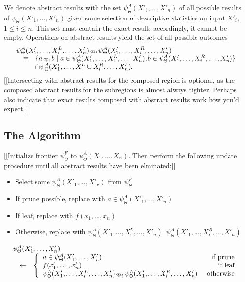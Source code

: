 \documentclass{article}
\newcommand{\opsym}{{\scriptstyle \mathrm{o\!p}}}
\newcommand{\opcurry}[3][]{\mathop{\opsym^{#1}_{#2}{#3}}}
\newcommand{\op}[2][]{\opcurry[#1]{#2}{}}
\newcommand{\GNP}{\psi_{\Theta}}
\begin{document}
We denote abstract results with the set $\GNP^A(X'_1,\ldots,X'_n)$ of
all possible results of $\GNP(X'_1,\ldots,X'_n)$ given some selection
of descriptive statistics on input $X'_i$, $1 \leq i \leq n$.  This
set must contain the exact result; accordingly, it cannot be empty.
Operations on abstract results yield the set of all possible outcomes
\[
\begin{array}{rcl}
  \lefteqn{\GNP^A(X'_1,\ldots,X^L_i,\ldots,X'_n) \op{i} \GNP^A(X'_1,\ldots,X^R_i,\ldots,X'_n)} \\
  & \equiv & \{a \op{i} b \mid a \in \GNP^A(X'_1,\ldots,X^L_i,\ldots,X'_n), b \in \GNP^A(X'_1,\ldots,X^R_i,\ldots,X'_n)\} \\
  & & \cap \GNP^A(X'_1,\ldots,X^L_i \cup X^R_i,\ldots,X'_n).
\end{array}
\]
[[Intersecting with abstract results for the composed region is
optional, as the composed abstract results for the subregions is
almost always tighter.  Perhaps also indicate that exact results
composed with abstract results work how you'd expect.]]

\subsection{The Algorithm}

[[Initialize frontier $\GNP^F$ to $\GNP^A(X_1,\ldots,X_n)$.  Then
perform the following update procedure until all abstract results have
been elminated:]]

\begin{itemize}
\item Select some $\GNP^A(X'_1,\ldots,X'_n)$ from $\GNP^F$
\item If prune possible, replace with $a \in \GNP^A(X'_1,\ldots,X'_n)$
\item If leaf, replace with $f(x_1,\ldots,x_n)$
\item Otherwise, replace with $\GNP^A(X'_1,\ldots,X^L_i,\ldots,X'_n) \op{i} \GNP^A(X'_1,\ldots,X^R_i,\ldots,X'_n)$
\end{itemize}

\[
\begin{array}{rcl}
  \lefteqn{\GNP^A(X'_1,\ldots,X'_n)} \\
  & \leftarrow & \left\{
  \begin{array}{lr}
    a \in \GNP^A(X'_1,\ldots,X'_n) & \mbox{ if prune} \\
    f(x'_1,\ldots,x'_n) & \mbox{ if leaf} \\
    \GNP^A(X'_1,\ldots,X^L_i,\ldots,X'_n) \op{i} \GNP^A(X'_1,\ldots,X^R_i,\ldots,X'_n) & \mbox{ otherwise}
  \end{array}
  \right.
\end{array}
\]
\end{document}
